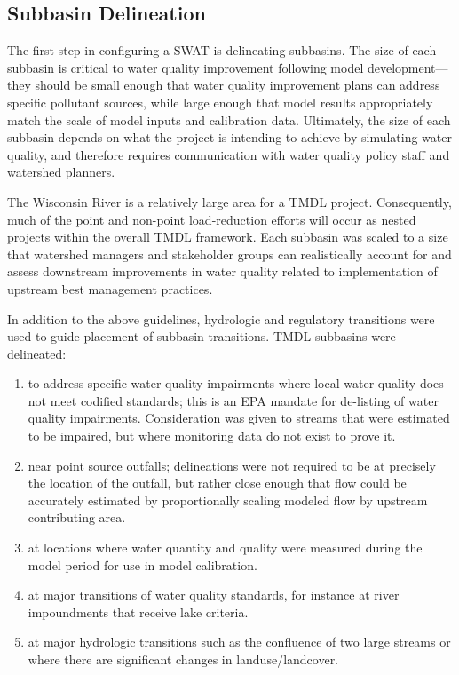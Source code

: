 \subsection{Subbasin Delineation}\label{sec:sub_delineation}
The first step in configuring a SWAT is delineating subbasins. The size of each subbasin is critical to water quality improvement following model development---they should be small enough that water quality improvement plans can address specific pollutant sources, while large enough that model results appropriately match the scale of model inputs and calibration data. Ultimately, the size of each subbasin depends on what the project is intending to achieve by simulating water quality, and therefore requires communication with water quality policy staff and watershed planners.


The Wisconsin River is a relatively large area for a TMDL project. Consequently, much of the point and non-point load-reduction efforts will occur as nested projects within the overall TMDL framework. Each subbasin was scaled to a size that watershed managers and stakeholder groups can realistically account for and assess downstream improvements in water quality related to implementation of upstream best management practices.

In addition to the above guidelines, hydrologic and regulatory transitions were used to guide placement of subbasin transitions. TMDL subbasins were delineated: 
\begin{enumerate}
	\item to address specific water quality impairments where local water quality does not meet codified standards; this is an EPA mandate for de-listing of water quality impairments. Consideration was given to streams that were estimated to be impaired, but where monitoring data do not exist to prove it.
	\item near point source outfalls; delineations were not required to be at precisely the location of the outfall, but rather close enough that flow could be accurately estimated by proportionally scaling modeled flow by upstream contributing area.
	\item at locations where water quantity and quality were measured during the model period for use in model calibration.
	\item at major transitions of water quality standards, for instance at river impoundments that receive lake criteria.
	\item at major hydrologic transitions such as the confluence of two large streams or where there are significant changes in landuse/landcover.
\end{enumerate}


